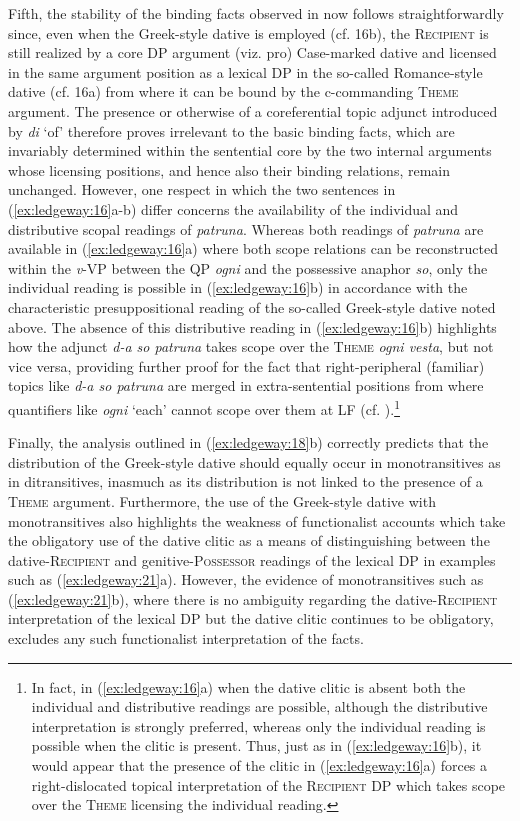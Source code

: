 \documentclass[output=paper,modfonts,nonflat]{langsci/langscibook}
\begin{document}
  Fifth, the stability of the binding facts observed in  now follows straightforwardly since, even when the Greek-style dative is employed (cf. 16b), the \textsc{Recipient} is still realized by a core DP argument (viz. pro) Case-marked dative and licensed in the same argument position as a lexical DP in the so-called Romance-style dative (cf. 16a) from where it can be bound by the c-commanding \textsc{Theme} argument. The presence or otherwise of a coreferential topic adjunct introduced by \textit{di} ‘of’ therefore proves irrelevant to the basic binding facts, which are invariably determined within the sentential core by the two internal arguments whose licensing positions, and hence also their binding relations, remain unchanged. However, one respect in which the two sentences in (\ref{ex:ledgeway:16}a-b) differ concerns the availability of the individual and distributive scopal readings of \textit{patruna}. Whereas both readings of \textit{patruna} are available in (\ref{ex:ledgeway:16}a) where both scope relations can be reconstructed within the \textit{v}{}-VP between the QP \textit{ogni} and the possessive anaphor \textit{so}, only the individual reading is possible in (\ref{ex:ledgeway:16}b) in accordance with the characteristic presuppositional reading of the so-called Greek-style dative noted above. The absence of this distributive reading in (\ref{ex:ledgeway:16}b) highlights how the adjunct \textit{d-a so patruna} takes scope over the \textsc{Theme} \textit{ogni vesta}, but not vice versa, providing further proof for the fact that right-peripheral (familiar) topics like \textit{d-a so patruna} are merged in extra-sentential positions from where quantifiers like \textit{ogni} ‘each’ cannot scope over them at LF (cf. \citealt{Cardinaletti2002,Frascarelli2004,Frascarelli2007}).\footnote{In fact, in (\ref{ex:ledgeway:16}a) when the dative clitic is absent both the individual and distributive readings are possible, although the distributive interpretation is strongly preferred, whereas only the individual reading is possible when the clitic is present. Thus, just as in (\ref{ex:ledgeway:16}b), it would appear that the presence of the clitic in (\ref{ex:ledgeway:16}a) forces a right-dislocated topical interpretation of the \textsc{Recipient} DP which takes scope over the \textsc{Theme} licensing the individual reading.}

  Finally, the analysis outlined in (\ref{ex:ledgeway:18}b) correctly predicts that the distribution of the Greek-style dative should equally occur in monotransitives as in ditransitives, inasmuch as its distribution is not linked to the presence of a \textsc{Theme} argument. Furthermore, the use of the Greek-style dative with monotransitives also highlights the weakness of functionalist accounts which take the obligatory use of the dative clitic as a means of distinguishing between the dative-\textsc{Recipient} and genitive-\textsc{Possessor} readings of the lexical DP in examples such as (\ref{ex:ledgeway:21}a). However, the evidence of monotransitives such as (\ref{ex:ledgeway:21}b), where there is no ambiguity regarding the dative-\textsc{Recipient} interpretation of the lexical DP but the dative clitic continues to be obligatory, excludes any such functionalist interpretation of the facts.
\end{document}
